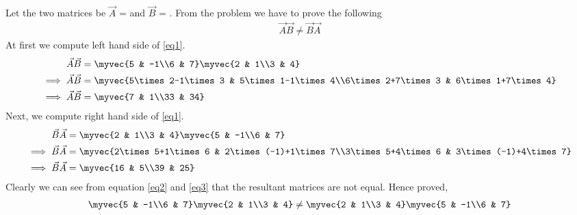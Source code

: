 Let the two matrices be $\vec{A}$ =  and $\vec{B}$ = . From the problem we have to prove the following
\begin{align}\label{eq:sol_mat_24_1_1}
\vec{A}\vec{B} \not= \vec{B}\vec{A}
\end{align}
At first we compute left hand side of \ref{eq1}.
\begin{align}
\vec{A}\vec{B} &= \myvec{5 & -1\\6 & 7}\myvec{2 & 1\\3 & 4}\label{eq:sol_mat_24_1_m1}\\
\implies \vec{A}\vec{B} &= \myvec{5\times2-1\times3 & 5\times1-1\times4\\6\times2+7\times3 & 6\times1+7\times4}\\
\implies\vec{A}\vec{B} &= \myvec{7 & 1\\33 & 34}\label{eq:sol_mat_24_1_2}
\end{align}
Next, we compute right hand side of \ref{eq1}.
\begin{align}
\vec{B}\vec{A} &= \myvec{2 & 1\\3 & 4}\myvec{5 & -1\\6 & 7}\\
\implies \vec{B}\vec{A} &= \myvec{2\times5+1\times6 & 2\times(-1)+1\times7\\3\times5+4\times6 & 3\times(-1)+4\times7}\\
\implies\vec{B}\vec{A} &= \myvec{16 & 5\\39 & 25}\label{eq:sol_mat_24_1_3}
\end{align}
Clearly we can see from equation \ref{eq2} and \ref{eq3} that the resultant matrices are not equal. Hence proved,
\begin{align*}
\myvec{5 & -1\\6 & 7}\myvec{2 & 1\\3 & 4} \not= \myvec{2 & 1\\3 & 4}\myvec{5 & -1\\6 & 7}
\end{align*}

